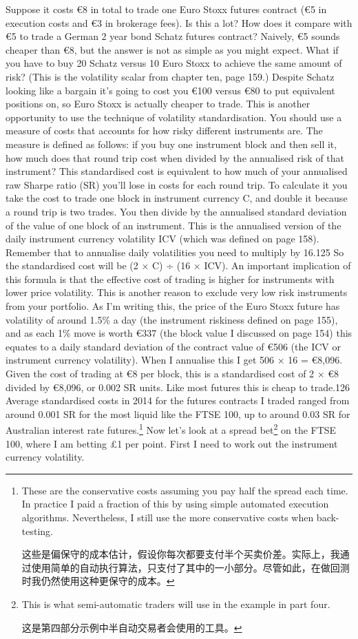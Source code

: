 Suppose it costs €8 in total to trade one Euro Stoxx futures contract (€5 in execution costs and €3 in brokerage fees). Is this a lot? How does it compare with €5 to trade a German 2 year bond Schatz futures contract? Naively, €5 sounds cheaper than €8, but the answer is not as simple as you might expect. What if you have to buy 20 Schatz versus 10 Euro Stoxx to achieve the same amount of risk? (This is the volatility scalar from chapter ten, page 159.) Despite Schatz looking like a bargain it's going to cost you €100 versus €80 to put equivalent positions on, so Euro Stoxx is actually cheaper to trade. This is another opportunity to use the technique of volatility standardisation. You should use a measure of costs that accounts for how risky different instruments are. The measure is defined as follows: if you buy one instrument block and then sell it, how much does that round trip cost when divided by the annualised risk of that instrument? This standardised cost is equivalent to how much of your annualised raw Sharpe ratio (SR) you'll lose in costs for each round trip. To calculate it you take the cost to trade one block in instrument currency C, and double it because a round trip is two trades. You then divide by the annualised standard deviation of the value of one block of an instrument. This is the annualised version of the daily instrument currency volatility ICV (which was defined on page 158). Remember that to annualise daily volatilities you need to multiply by 16.125 So the standardised cost will be (2 × C) ÷ (16 × ICV). An important implication of this formula is that the effective cost of trading is higher for instruments with lower price volatility. This is another reason to exclude very low risk instruments from your portfolio. As I'm writing this, the price of the Euro Stoxx future has volatility of around 1.5\% a day (the instrument riskiness defined on page 155), and as each 1\% move is worth €337 (the block value I discussed on page 154) this equates to a daily standard deviation of the contract value of €506 (the ICV or instrument currency volatility). When I annualise this I get 506 × 16 = €8,096. Given the cost of trading at €8 per block, this is a standardised cost of 2 × €8 divided by €8,096, or 0.002 SR units. Like most futures this is cheap to trade.126 Average standardised costs in 2014 for the futures contracts I traded ranged from around 0.001 SR for the most liquid like the FTSE 100, up to around 0.03 SR for Australian interest rate futures.\footnote{These are the conservative costs assuming you pay half the spread each time. In practice I paid a fraction of this by using simple automated execution algorithms. Nevertheless, I still use the more conservative costs when back-testing. \par 这些是偏保守的成本估计，假设你每次都要支付半个买卖价差。实际上，我通过使用简单的自动执行算法，只支付了其中的一小部分。尽管如此，在做回测时我仍然使用这种更保守的成本。} Now let's look at a spread bet\footnote{This is what semi-automatic traders will use in the example in part four. \par 这是第四部分示例中半自动交易者会使用的工具。} on the FTSE 100, where I am betting £1 per point. First I need to work out the instrument currency volatility. \begin{enumerate}

\end{enumerate}
